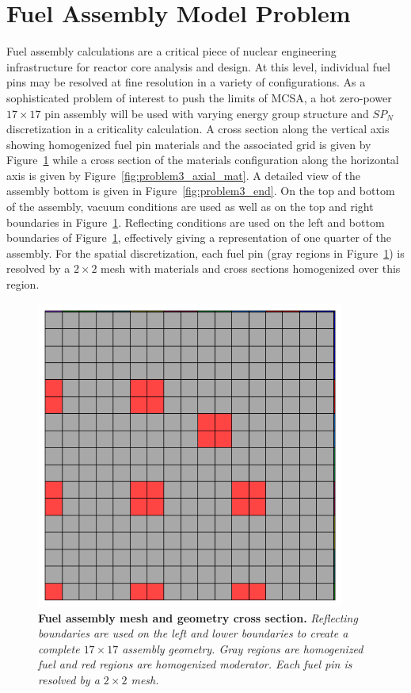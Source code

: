 \documentclass[letterpaper,12pt]{article}
\begin{document}
\section{Fuel Assembly Model Problem}
\label{sec:fuel_assembly}
Fuel assembly calculations are a critical piece of nuclear engineering
infrastructure for reactor core analysis and design. At this level,
individual fuel pins may be resolved at fine resolution in a variety
of configurations. As a sophisticated problem of interest to push the
limits of MCSA, a hot zero-power $17 \times 17$ pin assembly will be
used with varying energy group structure and $SP_N$ discretization in
a criticality calculation. A cross section along the vertical axis
showing homogenized fuel pin materials and the associated grid is
given by Figure~\ref{fig:problem3_radial_mat} while a cross section of
the materials configuration along the horizontal axis is given by
Figure~\ref{fig:problem3_axial_mat}. A detailed view of the assembly
bottom is given in Figure~\ref{fig:problem3_end}. On the top and
bottom of the assembly, vacuum conditions are used as well as on the
top and right boundaries in
Figure~\ref{fig:problem3_radial_mat}. Reflecting conditions are used
on the left and bottom boundaries of
Figure~\ref{fig:problem3_radial_mat}, effectively giving a
representation of one quarter of the assembly. For the spatial
discretization, each fuel pin (gray regions in
Figure~\ref{fig:problem3_radial_mat}) is resolved by a $2 \times 2$
mesh with materials and cross sections homogenized over this region.
\begin{figure}[t!]
  \begin{center}
    \includegraphics[width=4in]{problem3_radial_mat.png}
  \end{center}
  \caption{\textbf{Fuel assembly mesh and geometry cross section.}
    \textit{Reflecting boundaries are used on the left and lower
      boundaries to create a complete $17 \times 17$ assembly
      geometry. Gray regions are homogenized fuel and red regions are
      homogenized moderator. Each fuel pin is resolved by a $2 \times
      2$ mesh.}}
  \label{fig:problem3_radial_mat}
\end{figure}
\end{document}
